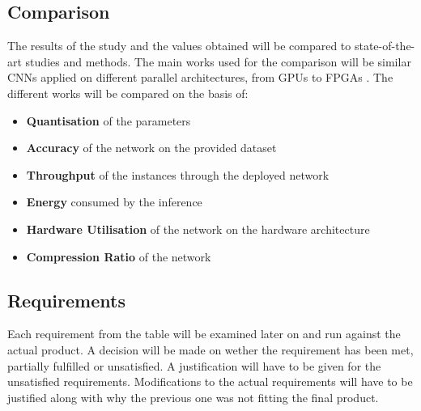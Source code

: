 
\subsection{Comparison}

The results of the study and the values obtained will be compared to state-of-the-art studies and methods. The main works used for the comparison will be similar CNNs applied on different parallel architectures, from GPUs \cite{Micikevicius2017, Jia2018, Kurth2018} to FPGAs \cite{Zhao2016, Colangelo2018, Jahanshahi2019, Bacchus2020}. The different works will be compared on the basis of:
\begin{itemize}
  \item \textbf{Quantisation} of the parameters
  \item \textbf{Accuracy} of the network on the provided dataset
  \item \textbf{Throughput} of the instances through the deployed network
  \item \textbf{Energy} consumed by the inference
  \item \textbf{Hardware Utilisation} of the network on the hardware architecture
  \item \textbf{Compression Ratio} of the network
\end{itemize}


\subsection{Requirements}

Each requirement from the table will be examined later on and run against the actual product. A decision will be made on wether the requirement has been met, partially fulfilled or unsatisfied. A justification will have to be given for the unsatisfied requirements. Modifications to the actual requirements will have to be justified along with why the previous one was not fitting the final product.


